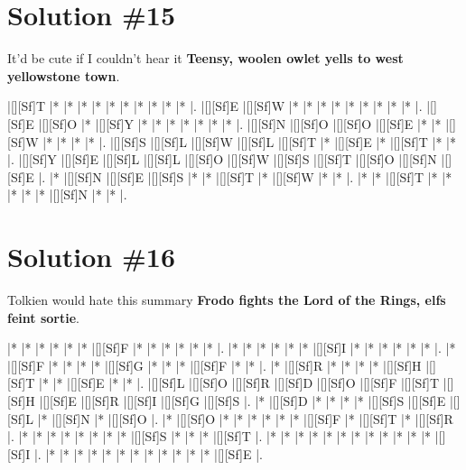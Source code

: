 \documentclass[letterpaper]{article}
\begin{document}
\newpage
\section*{Solution \#15}
It'd be cute if I couldn't hear it
\newline\textbf{Teensy, woolen owlet yells to west yellowstone town}.

\vspace*{1em}
\begin{Puzzle}{11}{9}
|[][Sf]T  |*        |*        |*        |*        |*        |*        |*        |*        |*        |*        |.
|[][Sf]E  |[][Sf]W  |*        |*        |*        |*        |*        |*        |*        |*        |*        |.
|[][Sf]E  |[][Sf]O  |*        |[][Sf]Y  |*        |*        |*        |*        |*        |*        |*        |.
|[][Sf]N  |[][Sf]O  |[][Sf]O  |[][Sf]E  |*        |*        |[][Sf]W  |*        |*        |*        |*        |.
|[][Sf]S  |[][Sf]L  |[][Sf]W  |[][Sf]L  |[][Sf]T  |*        |[][Sf]E  |*        |[][Sf]T  |*        |*        |.
|[][Sf]Y  |[][Sf]E  |[][Sf]L  |[][Sf]L  |[][Sf]O  |[][Sf]W  |[][Sf]S  |[][Sf]T  |[][Sf]O  |[][Sf]N  |[][Sf]E  |.
|*        |[][Sf]N  |[][Sf]E  |[][Sf]S  |*        |*        |[][Sf]T  |*        |[][Sf]W  |*        |*        |.
|*        |*        |[][Sf]T  |*        |*        |*        |*        |*        |[][Sf]N  |*        |*        |.
\end{Puzzle}

\newpage
\section*{Solution \#16}
Tolkien would hate this summary
\newline\textbf{Frodo fights the Lord of the Rings, elfs feint sortie}.

\vspace*{1em}
\begin{Puzzle}{13}{9}
|*        |*        |*        |*        |*        |*        |[][Sf]F  |*        |*        |*        |*        |*        |*        |.
|*        |*        |*        |*        |*        |*        |[][Sf]I  |*        |*        |*        |*        |*        |*        |.
|*        |[][Sf]F  |*        |*        |*        |*        |[][Sf]G  |*        |*        |*        |[][Sf]F  |*        |*        |.
|*        |[][Sf]R  |*        |*        |*        |*        |[][Sf]H  |[][Sf]T  |*        |*        |[][Sf]E  |*        |*        |.
|[][Sf]L  |[][Sf]O  |[][Sf]R  |[][Sf]D  |[][Sf]O  |[][Sf]F  |[][Sf]T  |[][Sf]H  |[][Sf]E  |[][Sf]R  |[][Sf]I  |[][Sf]G  |[][Sf]S  |.
|*        |[][Sf]D  |*        |*        |*        |*        |[][Sf]S  |[][Sf]E  |[][Sf]L  |*        |[][Sf]N  |*        |[][Sf]O  |.
|*        |[][Sf]O  |*        |*        |*        |*        |*        |*        |[][Sf]F  |*        |[][Sf]T  |*        |[][Sf]R  |.
|*        |*        |*        |*        |*        |*        |*        |*        |[][Sf]S  |*        |*        |*        |[][Sf]T  |.
|*        |*        |*        |*        |*        |*        |*        |*        |*        |*        |*        |*        |[][Sf]I  |.
|*        |*        |*        |*        |*        |*        |*        |*        |*        |*        |*        |*        |[][Sf]E  |.
\end{Puzzle}
\end{document}
